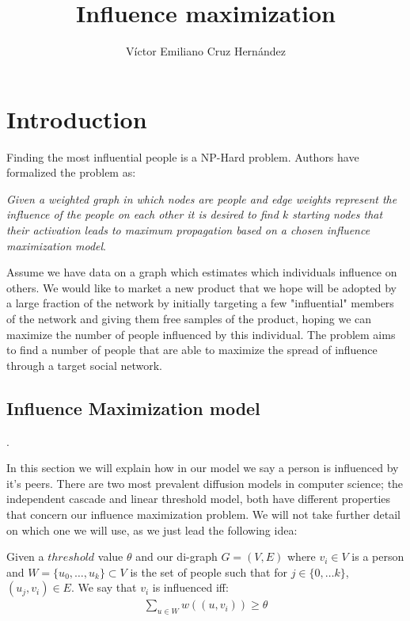 \documentclass[letter,10pt]{article}
\title{Influence maximization }
\author{Víctor Emiliano Cruz Hernández}
\theoremstyle{definition}
\begin{document}
\maketitle


\section{Introduction}

Finding the most influential people is a NP-Hard problem. Authors have formalized the problem as: 
\begin{center}
    \textit{Given a weighted graph in which nodes are people and edge weights represent the influence of the people on each other it is desired to find $k$ starting nodes that their activation leads to maximum propagation based on a chosen influence maximization model}.
\end{center}

Assume we have data on a graph which estimates which individuals influence on others. We would like to market a new product that we hope will be adopted by a large fraction of the network by initially targeting a few "influential" members of the network and giving them free samples of the product, hoping we can maximize the number of people influenced by this individual. The problem aims to find a number of people that are able to maximize the spread of influence through a target social network.

\subsection{Influence Maximization model}.

In this section we will explain how in our model we say a person is influenced by it's peers. There are two most prevalent diffusion models in computer science; the independent cascade and linear threshold model, both have different properties that concern our influence maximization problem. We will not take further detail on which one we will use, as we just lead the following idea:

Given a $threshold$ value $\theta$ and our di-graph $G=(V,E)$ where $v_i \in V$ is a person and $W=\{u_0, \dots , u_k\} \subset V$ is the set of people such that for $j\in \{0,\dots k\}$, $(u_j, v_i) \in E$. We say that $v_i$ is influenced iff:
\begin{align*}
    \sum_{u\in W}w( (u,v_i) ) \geq \theta
\end{align*}
\end{document}
